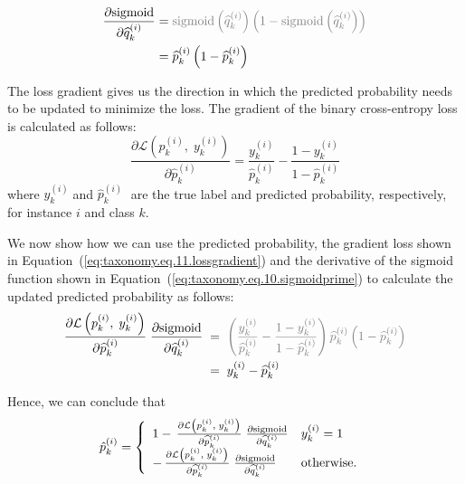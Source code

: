\documentclass[review,1p,times,numbers]{elsarticle}
\begin{document}
\begin{align}
    \label{eq:taxonomy.eq.10.sigmoidprime}
    \frac{\partial{\text{sigmoid}}}{\partial{\widehat{q}_k^{(i)}}}
    & = \textcolor{gray}{\text{sigmoid}\left(\widehat{q}_k^{(i)}\right)\left(1-\text{sigmoid}\left(\widehat{q}_k^{(i)}\right)\right)}
    \\
    & = \widehat{p}_k^{(i)}\left(1-\widehat{p}_k^{(i)}\right)
\end{align}

The loss gradient gives us the direction in which the predicted probability needs to be updated to minimize the loss. The gradient of the binary cross-entropy loss is calculated as follows:
\begin{equation}
    \label{eq:taxonomy.eq.11.lossgradient}
    \frac{\partial \mathcal{L} \left( \widehat{p}_k^{(i)},\;y_k^{(i)}\right)}{\partial \widehat{p}_k^{(i)} }=\frac{y_k^{(i)}}{\widehat{p}_k^{(i)}}-\frac{1-y_k^{(i)}}{1-\widehat{p}_k^{(i)}}
\end{equation}
where $y_k^{(i)}\; $and $\widehat{p}_k^{(i)}\; $ are the true label and predicted probability, respectively, for instance $i $ and class $k $.

We now show how we can use the predicted probability, the gradient loss shown in Equation~(\ref{eq:taxonomy.eq.11.lossgradient}) and the derivative of the sigmoid function shown in Equation~(\ref{eq:taxonomy.eq.10.sigmoidprime}) to calculate the updated predicted probability as follows:
\begin{align}
    \label{eq:taxonomy.eq.12.newpredelement}
    \frac{\partial \mathcal{L}\left(p_k^{(i)},\; y_k^{(i)}\right)}{\partial \widehat{p}_k^{(i)} }\; \frac{\partial{\text{sigmoid}}}{\partial{\widehat{q}_k^{(i)}}}
    & \; = \; \textcolor{gray}{\left(\frac{y_k^{(i)}}{\widehat{p}_k^{(i)}}-\frac{1-y_k^{(i)}}{1-\widehat{p}_k^{(i)}}\right)\widehat{p}_k^{(i)}\left(1-\widehat{p}_k^{(i)}\right) }
    \\
    & \; = \; y_k^{(i)}-\widehat{p}_k^{(i)}
\end{align}

Hence, we can conclude that
\begin{equation}
    \label{eq:taxonomy.eq.13.newpred}
    \begin{array}{@{}l}
    \hat{p}_{k}^{(i)} = \left\{
        \begin{array}{ll}
           1-\, \frac{\partial \mathcal{L}\left(p_k^{(i)},\;y_k^{(i)}\right)}{\partial \widehat{p}_k^{(i)} }\;{ \frac{\partial{\text{sigmoid}}}{\partial{\widehat{q}_k^{(i)}}}}
            &
            y_k^{(i)}=1
            \\
            -\,\frac{\partial \mathcal{L}\left(p_k^{(i)},\;y_k^{(i)}\right)}{\partial \widehat{p}_k^{(i)} }\; {\frac{\partial{\text{sigmoid}}}{\partial{\widehat{q}_k^{(i)}}}}
            &
            \text{otherwise.}
        \end{array}\right.
    \end{array}
\end{equation}
\end{document}

